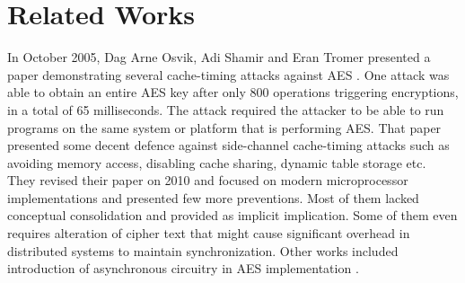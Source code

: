 \section{Related Works}

In October 2005, Dag Arne Osvik, Adi Shamir and Eran Tromer presented a paper demonstrating several cache-timing attacks against AES \cite{osvikold}. One attack was able to obtain an entire AES key after only 800 operations triggering encryptions, in a total of 65 milliseconds. The attack required the attacker to be able to run programs on the same system or platform that is performing AES. That paper presented some decent defence against side-channel cache-timing attacks such as avoiding memory access, disabling cache sharing, dynamic table storage etc.\\

They revised their paper on 2010 \cite{osvik} and focused on modern microprocessor implementations and presented few more preventions. Most of them lacked conceptual consolidation and provided as implicit implication. Some of them even requires alteration of cipher text that might cause significant overhead in distributed systems to maintain synchronization. Other works included introduction of asynchronous circuitry in AES implementation \cite{spadavecchia2006network}.\\

